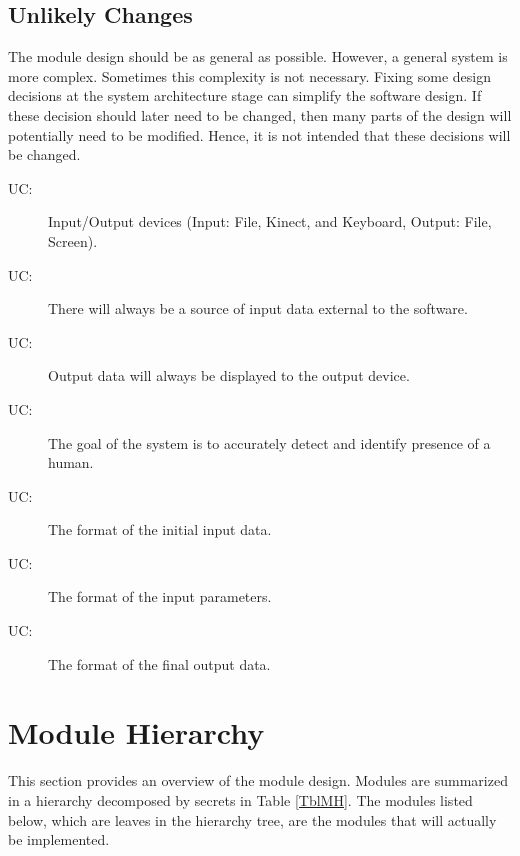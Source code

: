 \documentclass[12pt, titlepage]{article}
\newcounter{ucnum}
\newcommand{\uctheucnum}{UC\theucnum}
\begin{document}
\subsection{Unlikely Changes} \label{SecUchange}

The module design should be as general as possible. However, a general system is
more complex. Sometimes this complexity is not necessary. Fixing some design
decisions at the system architecture stage can simplify the software design. If
these decision should later need to be changed, then many parts of the design
will potentially need to be modified. Hence, it is not intended that these
decisions will be changed.

\begin{description}
\item[ \uctheucnum \label{ucIO}:] Input/Output devices
  (Input: File, Kinect, and Keyboard, Output: File, Screen).
\item[ \uctheucnum \label{ucInput}:] There will always
  be a source of input data external to the software.
\item[ \uctheucnum \label{ucOutput}:] Output data will
  always be displayed to the output device.
\item[ \uctheucnum \label{ucGoal}:] The goal of the system
  is to accurately detect and identify presence of a human.
\item[ \uctheucnum \label{ucFormatIn}:] The format of the 
  initial input data.
\item[ \uctheucnum \label{ucFormatParam}:] The format of the 
  input parameters.
\item[ \uctheucnum \label{ucFormatOut}:] The format of the
  final output data.
\end{description}

\section{Module Hierarchy} \label{SecMH}

This section provides an overview of the module design. Modules are summarized
in a hierarchy decomposed by secrets in Table \ref{TblMH}. The modules listed
below, which are leaves in the hierarchy tree, are the modules that will
actually be implemented.
\end{document}
